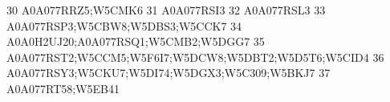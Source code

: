 \documentclass{beamer}
\begin{document}
\begin{frame}[fragile]
\begin{itemize}
\begin{Schunk}
\begin{Soutput}
30                                                                                                                                                                                                                                                                                                                                                              A0A077RRZ5;W5CMK6
31                                                                                                                                                                                                                                                                                                                                                                     A0A077RSI3
32                                                                                                                                                                                                                                                                                                                                                                     A0A077RSL3
33                                                                                                                                                                                                                                                                                                                                                A0A077RSP3;W5CBW8;W5DBS3;W5CCK7
34                                                                                                                                                                                                                                                                                                                                            A0A0H2UJ20;A0A077RSQ1;W5CMB2;W5DGG7
35                                                                                                                                                                                                                                                                                                                           A0A077RST2;W5CCM5;W5F6I7;W5DCW8;W5DBT2;W5D5T6;W5CID4
36                                                                                                                                                                                                                                                                                                                                  A0A077RSY3;W5CKU7;W5DI74;W5DGX3;W5C309;W5BKJ7
37                                                                                                                                                                                                                                                                                                                                                              A0A077RT58;W5EB41

\end{Soutput}
\end{Schunk}
\end{itemize}
\end{frame}
\end{document}
